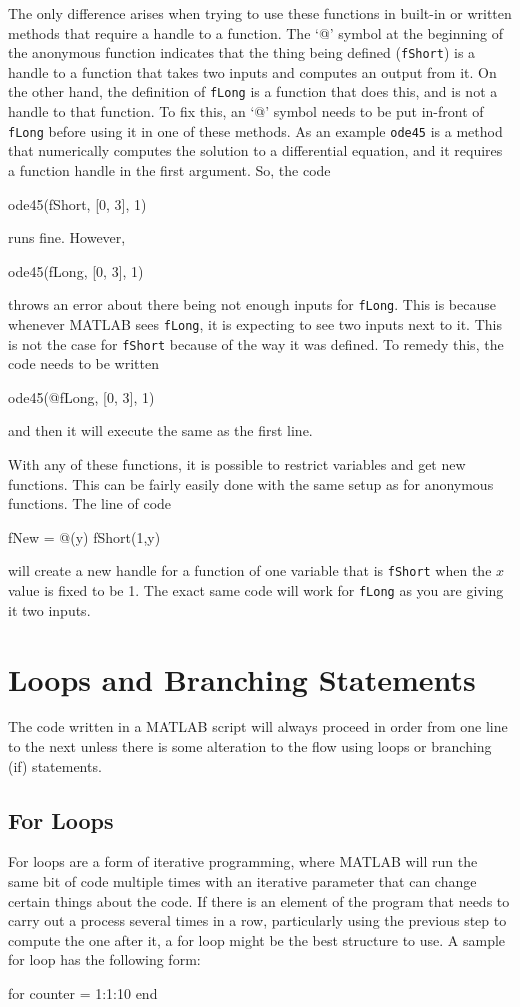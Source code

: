 The only difference arises when trying to use these functions in built-in or written methods that require a handle to a function. The `@' symbol at the beginning of the anonymous function indicates that the thing being defined (\texttt{fShort}) is a handle to a function that takes two inputs and computes an output from it. On the other hand, the definition of \texttt{fLong} is a function that does this, and is not a handle to that function. To fix this, an `@' symbol needs to be put in-front of \texttt{fLong} before using it in one of these methods. As an example \texttt{ode45} is a method that numerically computes the solution to a differential equation, and it requires a function handle in the first argument. So, the code
\begin{matlab}
ode45(fShort, [0, 3], 1)
\end{matlab}
runs fine. However, 
\begin{matlab}
ode45(fLong, [0, 3], 1)
\end{matlab}
throws an error about there being not enough inputs for \texttt{fLong}. This is because whenever MATLAB sees \texttt{fLong}, it is expecting to see two inputs next to it. This is not the case for \texttt{fShort} because of the way it was defined. To remedy this, the code needs to be written 
\begin{matlab}
ode45(@fLong, [0, 3], 1)
\end{matlab}
and then it will execute the same as the first line. 

With any of these functions, it is possible to restrict variables and get new functions. This can be fairly easily done with the same setup as for anonymous functions. The line of code
\begin{matlab}
fNew = @(y) fShort(1,y)
\end{matlab}
will create a new handle for a function of one variable that is \texttt{fShort} when the $x$ value is fixed to be 1. The exact same code will work for \texttt{fLong} as you are giving it two inputs. 

\section{Loops and Branching Statements}

The code written in a MATLAB script will always proceed in order from one line to the next unless there is some alteration to the flow using loops or branching (if) statements. 

\subsection{For Loops}
For loops are a form of iterative programming, where MATLAB will run the same bit of code multiple times with an iterative parameter that can change certain things about the code. If there is an element of the program that needs to carry out a process several times in a row, particularly using the previous step to compute the one after it, a for loop might be the best structure to use. A sample for loop has the following form:
\begin{matlab}
for counter = 1:1:10
end
\end{matlab}

